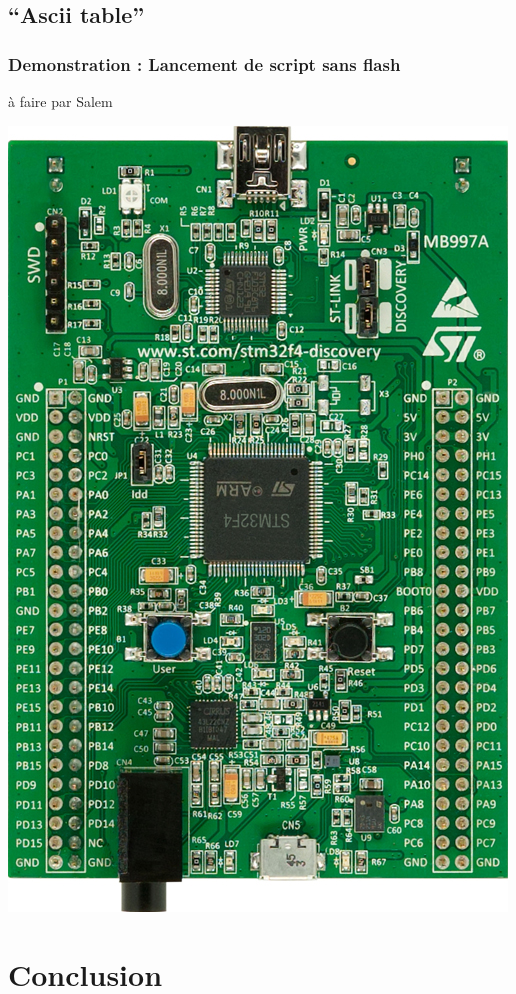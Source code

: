 \documentclass{beamer}
\begin{document}
\subsection{``Ascii table''}
\begin{frame}
\frametitle{Demonstration : Lancement de script sans flash}
à faire par Salem
\begin{center}
 \includegraphics[scale=0.1]{../images/stm32f4_discovery.jpg}
\end{center}
\end{frame}

\section{Conclusion}
\end{document}
